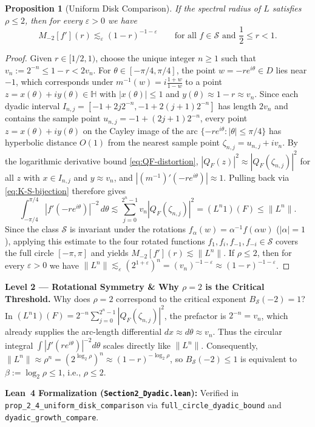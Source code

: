 \documentclass[12pt]{article}
\def\H{\mathbb{H}}
\def\S{\mathcal{S}}
\newtheorem{prop}[thm]{Proposition}
\theoremstyle{definition}
\numberwithin{equation}{section}
\begin{document}
\begin{prop}[Uniform Disk Comparison]\label{prop:disk-comparison}
If the spectral radius of $L$ satisfies $\rho \le 2$, then for every $\varepsilon > 0$ we have
\begin{equation}\label{eq:prop-disk-comparison}
  M_{-2}[f'](r) \lesssim_\varepsilon (1-r)^{-1-\varepsilon} \qquad \text{for all } f \in \S \text{ and } \frac{1}{2} \le r < 1.
\end{equation}
\end{prop}

\begin{proof}
Given $r \in [1/2, 1)$, choose the unique integer $n \ge 1$ such that $v_n := 2^{-n} \le 1 - r < 2 v_n$. For $\theta \in [-\pi/4, \pi/4]$, the point $w = -r e^{i\theta} \in D$ lies near $-1$, which corresponds under $m^{-1}(w) = i\frac{1+w}{1-w}$ to a point $z = x(\theta) + i y(\theta) \in \H$ with $|x(\theta)| \le 1$ and $y(\theta) \approx 1 - r \approx v_n$. Since each dyadic interval $I_{n, j} = [-1 + 2j 2^{-n}, -1 + 2(j+1)2^{-n}]$ has length $2 v_n$ and contains the sample point $u_{n, j} = -1 + (2j+1)2^{-n}$, every point $z = x(\theta) + i y(\theta)$ on the Cayley image of the arc $\{ -r e^{i\theta} : |\theta| \le \pi/4\}$ has hyperbolic distance $O(1)$ from the nearest sample point $\zeta_{n, j} = u_{n, j} + i v_n$. By the logarithmic derivative bound \eqref{eq:QF-distortion}, $|Q_F(z)|^2 \approx |Q_F(\zeta_{n, j})|^2$ for all $z$ with $x \in I_{n, j}$ and $y \approx v_n$, and $|(m^{-1})'(-re^{i\theta})| \approx 1$. Pulling back via \eqref{eq:K-S-bijection} therefore gives
\[
  \int_{-\pi/4}^{\pi/4} |f'(-r e^{i\theta})|^{-2} \, d\theta \lesssim \sum_{j=0}^{2^n-1} v_n |Q_F(\zeta_{n, j})|^2 = (L^n 1)(F) \le \|L^n\|.
\]
Since the class $\S$ is invariant under the rotations $f_\alpha(w) = \alpha^{-1} f(\alpha w)$ ($|\alpha| = 1$), applying this estimate to the four rotated functions $f_1, f_i, f_{-1}, f_{-i} \in \S$ covers the full circle $[-\pi, \pi]$ and yields $M_{-2}[f'](r) \lesssim \|L^n\|$. If $\rho \le 2$, then for every $\varepsilon > 0$ we have $\|L^n\| \lesssim_\varepsilon (2^{1+\varepsilon})^n = (v_n)^{-1-\varepsilon} \approx (1-r)^{-1-\varepsilon}$.
\end{proof}

\begin{leveltwo}
\noindent\textbf{\textcolor{l2border}{Level 2 --- Rotational Symmetry \& Why $\rho = 2$ is the Critical Threshold.}}
Why does $\rho = 2$ correspond to the critical exponent $B_{\S}(-2) = 1$? In $(L^n 1)(F) = 2^{-n} \sum_{j=0}^{2^n-1} |Q_F(\zeta_{n, j})|^2$, the prefactor is $2^{-n} = v_n$, which already supplies the arc-length differential $dx \approx d\theta \approx v_n$. Thus the circular integral $\int |f'(re^{i\theta})|^{-2} d\theta$ scales directly like $\|L^n\|$. Consequently, $\|L^n\| \approx \rho^n = (2^{\log_2 \rho})^n \approx (1-r)^{-\log_2 \rho}$, so $B_{\S}(-2) \le 1$ is equivalent to $\beta := \log_2 \rho \le 1$, i.e., $\rho \le 2$.

\smallskip
\noindent\textbf{\textcolor{leannote}{Lean~4 Formalization (\texttt{Section2\_Dyadic.lean}):}} Verified in \texttt{prop\_2\_4\_uniform\_disk\_comparison} via \texttt{full\_circle\_dyadic\_bound} and \texttt{dyadic\_growth\_compare}.
\end{leveltwo}
\end{document}
